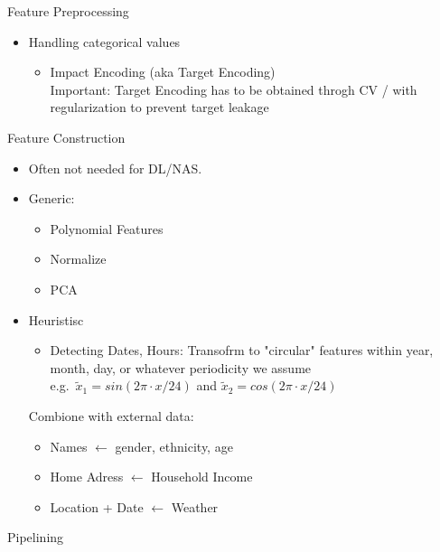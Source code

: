 \begin{frame}{Feature Preprocessing}
  \begin{itemize}
    \item Handling categorical values
    \begin{itemize}
      \item Impact Encoding (aka Target Encoding) \\
            Important: Target Encoding has to be obtained throgh CV / with regularization to prevent target leakage
    \end{itemize}
  \end{itemize}
\end{frame}

\begin{frame}{Feature Construction}
  \begin{itemize}
    \item Often not needed for DL/NAS.
    \item Generic:
    \begin{itemize}
      \item Polynomial Features
      \item Normalize 
      \item PCA
    \end{itemize}
    \item Heuristisc
    \begin{itemize}
      \item Detecting Dates, Hours: Transofrm to "circular" features within year, month, day, or whatever periodicity we assume \\
      e.g.\ $\tilde x_1 = sin(2\pi \cdot x /24)$ and $\tilde x_2 = cos(2\pi \cdot x /24)$
    \end{itemize}
    Combione with external data:
    \begin{itemize}
      \item Names $\leftarrow$ gender, ethnicity, age
      \item Home Adress $\leftarrow$ Household Income
      \item Location + Date $\leftarrow$ Weather
    \end{itemize}
  \end{itemize}
    
\end{frame}

\begin{frame}{Pipelining}
  
\end{frame}

